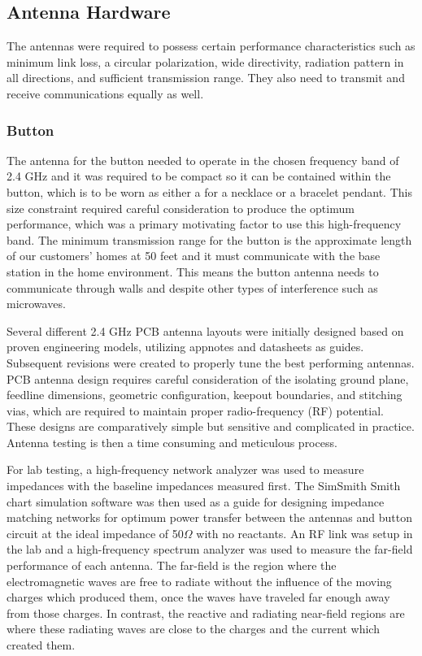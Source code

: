 \documentclass[journal,compsoc]{IEEEtran}
\begin{document}
\subsection {Antenna Hardware}

The antennas were required to possess certain performance characteristics such as minimum link loss, a circular polarization, wide directivity, radiation pattern in all directions, and sufficient transmission range.  They also need to transmit and receive communications equally as well.

\subsubsection{Button}

The antenna for the button needed to operate in the chosen frequency band of 2.4 GHz and it was required to be compact so it can be contained within the button, which is to be worn as either a for a necklace or a bracelet pendant.  This size constraint required careful consideration to produce the optimum performance, which was a primary motivating factor to use this high-frequency band.  The minimum transmission range for the button is the approximate length of our customers’ homes at 50 feet and it must communicate with the base station in the home environment.  This means the button antenna needs to communicate through walls and despite other types of interference such as microwaves.

Several different 2.4 GHz PCB antenna layouts were initially designed based on proven engineering models, utilizing appnotes and datasheets as guides.  Subsequent revisions were created to properly tune the best performing antennas.  PCB antenna design requires careful consideration of the isolating ground plane, feedline dimensions, geometric configuration, keepout boundaries, and stitching vias, which are required to maintain proper radio-frequency (RF) potential.  These designs are comparatively simple but sensitive and complicated in practice.  Antenna testing is then a time consuming and meticulous process.

For lab testing, a high-frequency network analyzer was used to measure impedances with the baseline impedances measured first.  The SimSmith Smith chart simulation software was then used as a guide for designing impedance matching networks for optimum power transfer between the antennas and button circuit at the ideal impedance of 50$\Omega$ with no reactants.  An RF link was setup in the lab and a high-frequency spectrum analyzer was used to measure the far-field performance of each antenna.  The far-field is the region where the electromagnetic waves are free to radiate without the influence of the moving charges which produced them, once the waves have traveled far enough away from those charges.  In contrast, the reactive and radiating near-field regions are where these radiating waves are close to the charges and the current which created them.
\end{document}
